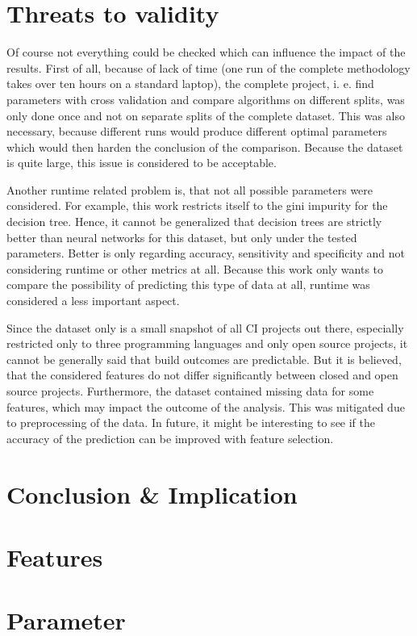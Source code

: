 \documentclass[a4paper,11pt]{article}
\begin{document}
\section{Threats to validity}

Of course not everything could be checked which can influence the impact of the results. First of all, because of lack of time (one run of the complete methodology takes over ten hours on a standard laptop), the complete project, i. e. find parameters with cross validation and compare algorithms on different splits, was only done once and not on separate splits of the complete dataset. This was also necessary, because different runs would produce different optimal parameters which would then harden the conclusion of the comparison. Because the dataset is quite large, this issue is considered to be acceptable. 

Another runtime related problem is, that not all possible parameters were considered. For example, this work restricts itself to the gini impurity for the decision tree. Hence, it cannot be generalized that decision trees are strictly better than neural networks for this dataset, but only under the tested parameters. Better is only regarding accuracy, sensitivity and specificity and not considering runtime or other metrics at all. Because this work only wants to compare the possibility of predicting this type of data at all, runtime was considered a less important aspect. 

Since the dataset only is a small snapshot of all CI projects out there, especially restricted only to three programming languages and only open source projects, it cannot be generally said that build outcomes are predictable. But it is believed, that the considered features do not differ significantly between closed and open source projects. Furthermore, the dataset contained missing data for some features, which may impact the outcome of the analysis. This was mitigated due to preprocessing of the data. In future, it might be interesting to see if the accuracy of the prediction can be improved with feature selection. 


\section{Conclusion \& Implication}	





\appendix

\section{Features}



\section{Parameter}



\end{document}
